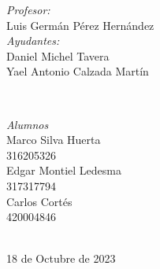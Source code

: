 \begin{titlepage}
    \vspace{10mm}
    \begin{minipage}{0.7\textwidth}
        \begin{flushleft} \large
            \emph{Profesor:}\\
                Luis Germán Pérez Hernández\\
                \vspace{3mm}
                \emph{Ayudantes:}\\
                Daniel Michel Tavera\\
                Yael Antonio Calzada Martín\\
        \end{flushleft}
    \end{minipage}
    \\
    \vspace{10mm}
    \begin{minipage}{0.4\textwidth}
        \begin{flushright} \large
        \centering
            \emph{Alumnos} \\ %
            \vspace{3mm}
            Marco Silva Huerta\\
            316205326\\
            \vspace{4mm}
            Edgar Montiel Ledesma\\
            317317794\\
            \vspace{4mm}
            Carlos Cortés\\
            420004846
        \end{flushright}
    \end{minipage}\\[1.2cm]
    \makeatother
    {\large 18 de Octubre de 2023}\\[2cm]
    \vfill 
    \end{titlepage}
